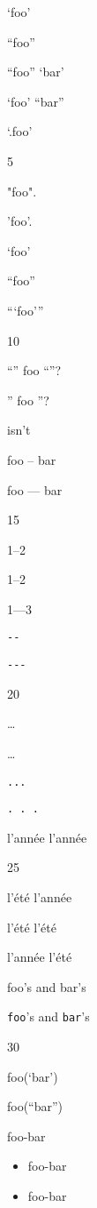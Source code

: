 
\def\mytitle{Smart Quotes}


`foo'

``foo''

``foo'' `bar'

`foo' ``bar''

`.foo'

5

"foo".

'foo'.

`foo'

``foo''

```foo'''

10

``'' foo ``''?

'' foo ''?

isn't

foo -- bar

foo --- bar

15

1--2

1--2

1---3

\texttt{-{}-}

\texttt{-{}-{}-}

20

{\ldots}

{\ldots}

\texttt{...}

\texttt{. . .}

l'année l'année

25

l'été l'année

l'été l'été

l'année l'été

foo's and bar's

\texttt{foo}'s and \texttt{bar}'s

30

foo(`bar')

foo(``bar'')

foo-bar

\begin{itemize}
\item{} foo-bar

\item{} foo-bar

\end{itemize}



